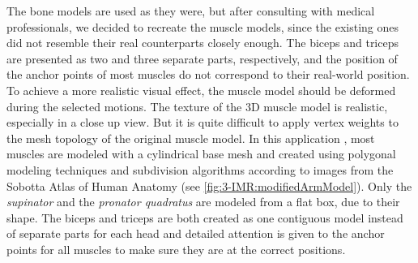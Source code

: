 The bone models are used as they were, but after consulting with medical professionals, we decided to recreate the muscle models, since the existing ones did not resemble their real counterparts closely enough. The biceps and triceps are presented as two and three separate parts, respectively, and the position of the anchor points of most muscles do not correspond to their real-world position. To achieve a more realistic visual effect, the muscle model should be deformed during the selected motions.
The texture of the 3D muscle model is realistic, especially in a close up view. But it is quite difficult to apply vertex weights to the mesh topology of the original muscle model. 
In this application , most muscles are modeled with a cylindrical base mesh and created using polygonal modeling techniques and subdivision algorithms according to images from the Sobotta Atlas of Human Anatomy (see \figurename{\ref{fig:3-IMR:modifiedArmModel}}). Only the \textit{supinator} and the \textit{pronator quadratus} are modeled from a flat box, due to their shape. The biceps and triceps are both created as one contiguous model instead of separate parts for each head and detailed attention is given to the anchor points for all muscles to make sure they are at the correct positions.
